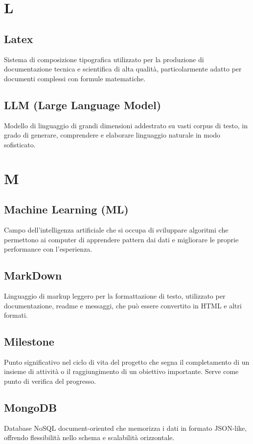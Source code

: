 \documentclass[a4paper,11pt]{article}
\begin{document}
\newpage
\section{L}

\subsection{Latex}
Sistema di composizione tipografica utilizzato per la produzione di documentazione tecnica e scientifica di alta qualità, particolarmente adatto per documenti complessi con formule matematiche.

\subsection{LLM (Large Language Model)}
Modello di linguaggio di grandi dimensioni addestrato su vasti corpus di testo, in grado di generare, comprendere e elaborare linguaggio naturale in modo sofisticato.

\newpage
\section{M}

\subsection{Machine Learning (ML)}
Campo dell'intelligenza artificiale che si occupa di sviluppare algoritmi che permettono ai computer di apprendere pattern dai dati e migliorare le proprie performance con l'esperienza.

\subsection{MarkDown}
Linguaggio di markup leggero per la formattazione di testo, utilizzato per documentazione, readme e messaggi, che può essere convertito in HTML e altri formati.

\subsection{Milestone}
Punto significativo nel ciclo di vita del progetto che segna il completamento di un insieme di attività o il raggiungimento di un obiettivo importante. Serve come punto di verifica del progresso.

\subsection{MongoDB}
Database NoSQL document-oriented che memorizza i dati in formato JSON-like, offrendo flessibilità nello schema e scalabilità orizzontale.
\end{document}
